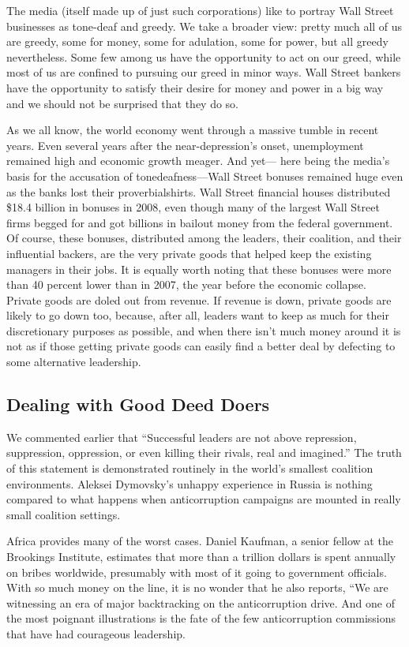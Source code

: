 \documentclass[10pt]{article}
\begin{document}
{\large The media (itself made up of just such corporations) like to portray
Wall Street businesses as tone-deaf and greedy. We take a broader view: pretty
much all of us are greedy, some for money, some for adulation, some for power,
but all greedy nevertheless. Some few among us have the opportunity to act on our
greed, while most of us are confined to pursuing our greed in minor ways. Wall
Street bankers have the opportunity to satisfy their desire for money and power
in a big way and we should not be surprised that they do so.}

{\large As we all know, the world economy went through a massive tumble in
recent years. Even several years after the near-depression's onset, unemployment
remained high and economic growth meager. And yet--- here being the media's basis
for the accusation of tonedeafness---Wall Street bonuses remained huge even as
the banks lost their proverbialshirts. Wall Street financial houses distributed
\$18.4 billion in bonuses in 2008, even though many of the largest Wall Street
firms begged for and got billions in bailout money from the federal government.
Of course, these bonuses, distributed among the leaders, their coalition, and
their influential backers, are the very private goods that helped keep the
existing managers in their jobs. It is equally worth noting that these bonuses
were more than 40 percent lower than in 2007, the year before the economic
collapse. Private goods are doled out from revenue. If revenue is down, private
goods are likely to go down too, because, after all, leaders want to keep as much
for their discretionary purposes as possible, and when there isn't much money
around it is not as if those getting private goods can easily find a better deal
by defecting to some alternative leadership.}

\subsection{Dealing with Good Deed Doers}

{\large We commented earlier that ``Successful leaders are not above repression,
suppression, oppression, or even killing their rivals, real and imagined.'' The
truth of this statement is demonstrated routinely in the world's smallest
coalition environments. Aleksei Dymovsky's unhappy experience in Russia is
nothing compared to what happens when anticorruption campaigns are mounted in
really small coalition settings.}

{\large Africa provides many of the worst cases. Daniel Kaufman, a senior fellow
at the Brookings Institute, estimates that more than a trillion dollars is spent
annually on bribes worldwide, presumably with most of it going to government
officials. With so much money on the line, it is no wonder that he also reports,
``We are witnessing an era of major backtracking on the anticorruption drive. And
one of the most poignant illustrations is the fate of the few anticorruption
commissions that have had courageous leadership.}
\end{document}
